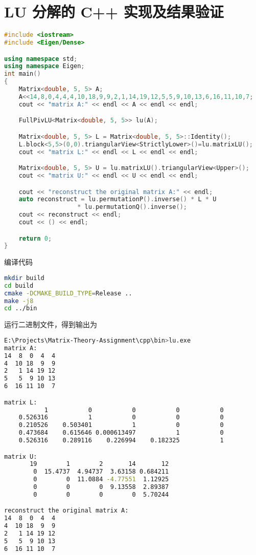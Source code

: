 \section{LU 分解的 C++ 实现及结果验证}
\begin{lstlisting}[language=C++]
#include <iostream>
#include <Eigen/Dense>

using namespace std;
using namespace Eigen;
int main()
{
    Matrix<double, 5, 5> A;
    A<<14,8,0,4,4,4,10,18,9,9,2,1,14,19,12,5,5,9,10,13,6,16,11,10,7;
    cout << "matrix A:" << endl << A << endl << endl;

    FullPivLU<Matrix<double, 5, 5>> lu(A);

    Matrix<double, 5, 5> L = Matrix<double, 5, 5>::Identity();
    L.block<5,5>(0,0).triangularView<StrictlyLower>()=lu.matrixLU();
    cout << "matrix L:" << endl << L << endl << endl;

    Matrix<double, 5, 5> U = lu.matrixLU().triangularView<Upper>();
    cout << "matrix U:" << endl << U << endl << endl;

    cout << "reconstruct the original matrix A:" << endl;
    auto reconstruct = lu.permutationP().inverse() * L * U
                    * lu.permutationQ().inverse();
    cout << reconstruct << endl;
    cout << () << endl;

    return 0;
}
\end{lstlisting}

编译代码
\begin{lstlisting}[language=bash]
mkdir build
cd build
cmake -DCMAKE_BUILD_TYPE=Release ..
make -j8
cd ../bin
\end{lstlisting}
运行二进制文件，得到输出为
\begin{lstlisting}[language=bash]
E:\Projects\Matrix-Theory-Assignment\cpp\bin>lu.exe
matrix A:
14  8  0  4  4
4  10 18  9  9
2   1 14 19 12
5   5  9 10 13
6  16 11 10  7

matrix L:
           1           0           0           0           0
    0.526316           1           0           0           0
    0.210526    0.503401           1           0           0
    0.473684    0.615646 0.000613497           1           0
    0.526316    0.289116    0.226994    0.182325           1

matrix U:
       19        1        2       14       12
        0  15.4737  4.94737  3.63158 0.684211
        0        0  11.0884 -4.77551  1.12925
        0        0        0  9.13558  2.89387
        0        0        0        0  5.70244

reconstruct the original matrix A:
14  8  0  4  4
4  10 18  9  9
2   1 14 19 12
5   5  9 10 13
6  16 11 10  7
\end{lstlisting}
